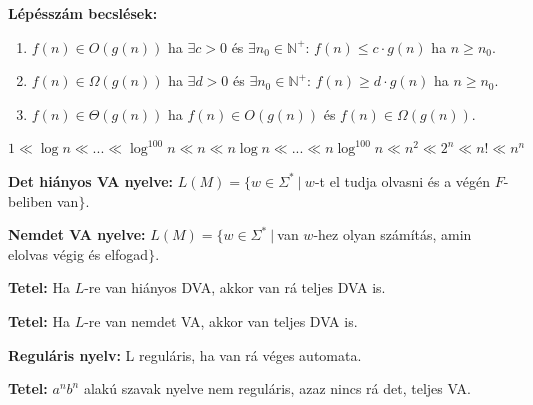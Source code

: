 \documentclass[a4paper]{article}
\begin{document}
\begin{tcolorbox}[size = fbox]
  \textbf{Lépésszám becslések:}
  \begin{enumerate}[label=(\roman*)]
    \item $f(n) \in O(g(n))$ ha $\exists c > 0$ és $\exists n_{0} \in \mathbb{N}^{+}$: $f(n) \leq c \cdot g(n)$ ha $n \geq n_{0}$.
    \item $f(n) \in \Omega(g(n))$ ha $\exists d > 0$ és $\exists n_{0} \in \mathbb{N}^{+}$: $f(n) \geq d \cdot g(n)$ ha $n \geq n_{0}$.
    \item $f(n) \in \Theta(g(n))$ ha $f(n) \in O(g(n))$ és $f(n) \in \Omega(g(n))$.
  \end{enumerate}
\end{tcolorbox}

\begin{tcolorbox}[colback = blue!5, colframe = blue, size = fbox]
  \begin{center}
    $1 \ll \log{n} \ll ... \ll \log^{100}{n} \ll n \ll n\log{n} \ll ... \ll n\log^{100}{n} \ll n^2 \ll 2^n \ll n! \ll n^n$
  \end{center}
\end{tcolorbox}

\begin{tcolorbox}[size = fbox]
  \textbf{Det hiányos VA nyelve:} $L(M) = \{w \in \Sigma^{*}\ |\ w$-t el tudja olvasni és a végén $F$-beliben van$\}$.
\end{tcolorbox}

\begin{tcolorbox}[size = fbox]
  \textbf{Nemdet VA nyelve:} $L(M) = \{w \in \Sigma^{*}\ |\ $van $w$-hez olyan számítás, amin elolvas végig és elfogad$\}$.
\end{tcolorbox}

\begin{tcolorbox}[size = fbox]
  \textbf{Tetel:} Ha $L$-re van hiányos DVA, akkor van rá teljes DVA is.
\end{tcolorbox}

\begin{tcolorbox}[size = fbox]
  \textbf{Tetel:} Ha $L$-re van nemdet VA, akkor van teljes DVA is.
\end{tcolorbox}

\begin{tcolorbox}[size = fbox]
  \textbf{Reguláris nyelv:} L reguláris, ha van rá véges automata.
\end{tcolorbox}

\begin{tcolorbox}[size = fbox]
  \textbf{Tetel:} $a^{n}b^{n}$ alakú szavak nyelve nem reguláris, azaz nincs rá det, teljes VA.
\end{tcolorbox}
\end{document}
